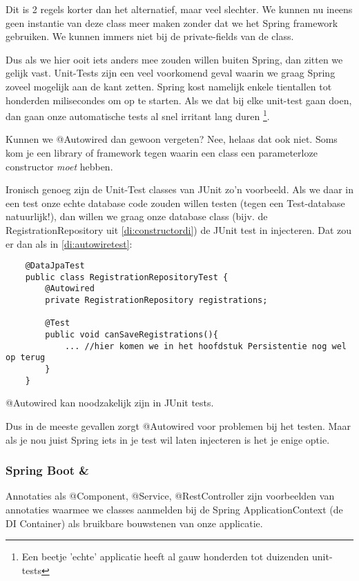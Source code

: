 Dit is 2 regels korter dan het alternatief, maar veel slechter. We kunnen nu ineens geen instantie van deze class
meer maken zonder dat we het Spring framework gebruiken. We kunnen immers niet bij de private-fields van de class.

Dus als we hier ooit iets anders mee zouden willen buiten Spring, dan zitten we gelijk vast. Unit-Tests zijn een 
veel voorkomend geval waarin we graag Spring zoveel mogelijk aan de kant zetten. Spring kost namelijk enkele tientallen
tot honderden milisecondes om op te starten. Als we dat bij elke unit-test gaan doen, dan gaan onze automatische
tests al snel irritant lang duren \footnote{Een beetje 'echte' applicatie heeft al gauw honderden tot duizenden unit-tests}.

Kunnen we @Autowired dan gewoon vergeten? Nee, helaas dat ook niet.
Soms kom je een library of framework tegen waarin een class een parameterloze constructor \emph{moet} hebben.

Ironisch genoeg zijn de Unit-Test classes van JUnit zo'n voorbeeld. Als we daar in een test onze echte database code
zouden willen testen (tegen een Test-database natuurlijk!), dan willen we graag onze database class (bijv. de RegistrationRepository
uit \ref{di:constructordi}) de JUnit test in injecteren. Dat zou er dan als in \ref{di:autowiretest}:

\begin{listing}[H]
    \begin{verbatim}
    @DataJpaTest
    public class RegistrationRepositoryTest {
        @Autowired
        private RegistrationRepository registrations;

        @Test
        public void canSaveRegistrations(){
            ... //hier komen we in het hoofdstuk Persistentie nog wel op terug
        }
    }
    \end{verbatim}
    \caption{@Autowired kan noodzakelijk zijn in JUnit tests.}
    \label{di:autowiretest}
\end{listing}

Dus in de meeste gevallen zorgt @Autowired voor problemen bij het testen. Maar als je nou juist Spring iets in je test 
wil laten injecteren is het je enige optie. 

\subsubsection*{Spring Boot \& \@Configuration}

Annotaties als @Component, @Service, @RestController zijn voorbeelden van annotaties waarmee we 
classes aanmelden bij de Spring ApplicationContext (de DI Container) als bruikbare bouwstenen van 
onze applicatie.

